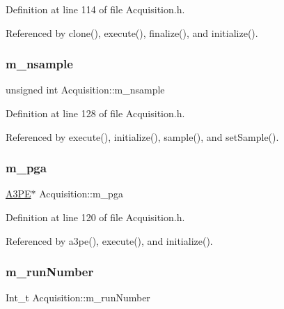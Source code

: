 Definition at line 114 of file Acquisition.\+h.



Referenced by clone(), execute(), finalize(), and initialize().

\mbox{\label{classAcquisition_a26d0f1a44309ffac49c365b7ee568ab2}} 
\subsubsection{\texorpdfstring{m\+\_\+nsample}{m\_nsample}}
{\footnotesize\ttfamily unsigned int Acquisition\+::m\+\_\+nsample\hspace{0.3cm}{\ttfamily [private]}}



Definition at line 128 of file Acquisition.\+h.



Referenced by execute(), initialize(), sample(), and set\+Sample().

\mbox{\label{classAcquisition_aac113fd42c6574cdb4154e9808a21b67}} 
\subsubsection{\texorpdfstring{m\+\_\+pga}{m\_pga}}
{\footnotesize\ttfamily \hyperlink{classA3PE}{A3\+PE}$\ast$ Acquisition\+::m\+\_\+pga\hspace{0.3cm}{\ttfamily [private]}}



Definition at line 120 of file Acquisition.\+h.



Referenced by a3pe(), execute(), and initialize().

\mbox{\label{classAcquisition_afd35e220e0bfda7e763584524273aeb0}} 
\subsubsection{\texorpdfstring{m\+\_\+run\+Number}{m\_runNumber}}
{\footnotesize\ttfamily Int\+\_\+t Acquisition\+::m\+\_\+run\+Number\hspace{0.3cm}{\ttfamily [private]}}



